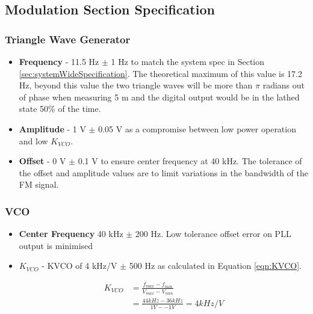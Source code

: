 \subsection{Modulation Section Specification}

\subsubsection{Triangle Wave Generator}
\label{sec:specificationTriangleWaveGenerator}
\begin{itemize}
    \item \textbf{Frequency} - 11.5 Hz $\pm$ 1 Hz to match the system spec in Section \ref{sec:systemWideSpecification}. The theoretical maximum of this value is 17.2 Hz, beyond this value the two triangle waves will be more than $\pi$ radians out of phase when measuring 5 m and the digital output would be in the lathed state 50\% of the time.
    \item \textbf{Amplitude} - 1 V $\pm$ 0.05 V as a compromise between low power operation and low $K_{VCO}$.
    \item \textbf{Offset} - 0 V $\pm$ 0.1 V to ensure center frequency at 40 kHz. 
    The tolerance of the offset and amplitude values are to limit variations in the bandwidth of the FM signal.
\end{itemize}

\subsubsection{VCO}
\label{sec:specificationVCO}
\begin{itemize}
    \item \textbf{Center Frequency} 40 kHz $\pm$ 200 Hz. Low tolerance offset error on PLL output is minimised
    \item \textbf{$K_{VCO}$} - KVCO of 4 kHz/V $\pm$ 500 Hz as calculated in Equation \eqref{eqn:KVCO}.

    \begin{equation}
        \begin{split}
             K_{VCO} &= \frac{f_{max} - f_{min}}{V_{max} - V_{min}}\\
                     &= \frac{44 kHz - 36 kHz}{1V - -1V} = 4 kHz/V
        \end{split}
        \label{eqn:KVCO}
    \end{equation}
\end{itemize}

